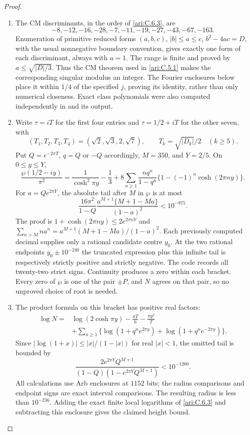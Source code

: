 \begin{proof}
\begin{enumerate}[label=\arabic*.,leftmargin=*]
\item The CM discriminants, in the order of \ref{ari:C.6.3}, are
\[
 -8,-12,-16,-28,-7,-11,-19,-27,-43,-67,-163.
\]
Enumeration of primitive reduced forms
$(a,b,c)$, $|b|\le a\le c$, $b^2-4ac=D$, with the usual
nonnegative boundary convention, gives exactly one form of
each discriminant, always with $a=1$.
The range is finite and proved by $a\le\sqrt{|D|/3}$.
Thus the CM theorem used in \ref{ari:C.5.1} makes the corresponding
singular modulus an integer. The Fourier enclosures below
place it within $1/4$ of the specified $j$, proving its
identity, rather than only numerical closeness. Exact class
polynomials were also computed independently in
 and its output.

\item Write $\tau=iT$ for the first four entries and
$\tau=1/2+iT$ for the other seven, with
\[
 (T_1,T_2,T_3,T_4)=(\sqrt2,\sqrt3,2,\sqrt7),\qquad
 T_k=\sqrt{|D_k|}/2\quad(k\ge5).
\]
Put $Q=e^{-2\pi T}$, $q=Q$ or $-Q$ accordingly,
$M=350$, and $Y=2/5$. On $0\le y\le Y$,
\begin{equation}\label{ari:eq:ch-wp-bracket}
 \frac{\wp(1/2-iy)}{\pi^2}
 =\frac1{\cosh^2\pi y}-\frac13+
 8\sum_{n\ge1}\frac{nq^n}{1-q^n}
                 \{1-(-1)^n\cosh(2\pi ny)\}.
\end{equation}
For $a=Qe^{2\pi Y}$, the absolute tail after $M$ in
$\wp$ is at most
\[
 \frac{16\pi^2}{1-Q}
 \frac{a^{M+1}\{M+1-Ma\}}{(1-a)^2}<10^{-875}.
\]
The proof is $1+\cosh(2\pi ny)\le2e^{2\pi nY}$ and
$\sum_{n>M}na^n=a^{M+1}(M+1-Ma)/(1-a)^2$.
Each previously computed decimal supplies only a rational
candidate centre $y_0$. At the two rational endpoints
$y_0\pm10^{-240}$ the truncated expression plus this
infinite tail is respectively strictly positive and strictly
negative. The code records all twenty-two strict signs.
Continuity produces a zero within each bracket. Every zero
of $\wp$ is one of the pair $\pm P$, and $N$ agrees on
that pair, so no unproved choice of root is needed.

\item The product formula on this bracket has positive real factors:
\begin{align*}
 \log N={}&\log(2\cosh\pi y)-\frac{\pi T}{6}
                      -\frac{\pi y^2}{T}\\
 &+\sum_{n\ge1}\{\log(1+q^ne^{2\pi y})
                         +\log(1+q^ne^{-2\pi y})\}.
\end{align*}
Since $|\log(1+x)|\le |x|/(1-|x|)$ for real $|x|<1$,
the omitted tail is bounded by
\[
 \frac{2e^{2\pi Y}Q^{M+1}}
 {(1-Q)(1-e^{2\pi Y}Q^{M+1})}<10^{-1260}.
\]
All calculations use Arb enclosures at $1152$ bits; the
radius comparisons and endpoint signs are exact interval
comparisons. The resulting radius is less than $10^{-236}$.
Adding the exact finite local logarithms of \ref{ari:C.6.3} and
subtracting this enclosure gives the claimed height bound.


\end{enumerate}
\end{proof}
